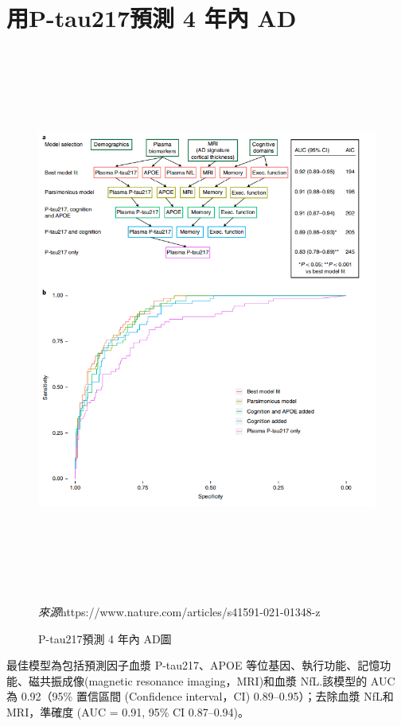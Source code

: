 \section{用P-tau217預測 4 年內 AD }
\begin{figure}[H]
	\centering
	\centerline{\includegraphics[height=18cm]{pic/AD217.PNG}}
	\caption{P-tau217預測 4 年內 AD圖}
	\begin{minipage}{.7\linewidth}
		\centering
		\footnotesize
		\emph{來源}https://www.nature.com/articles/s41591-021-01348-z
	\end{minipage}
	\label{fig:AD217}
\end{figure}
最佳模型為包括預測因子血漿 P-tau217、APOE 等位基因、執行功能、記憶功能、磁共振成像(magnetic resonance imaging，MRI)和血漿 NfL.該模型的 AUC 為 0.92（95\% 置信區間 (Confidence interval，CI) 0.89–0.95）；去除血漿 NfL和MRI，準確度 (AUC = 0.91, 95\% CI 0.87–0.94)。


